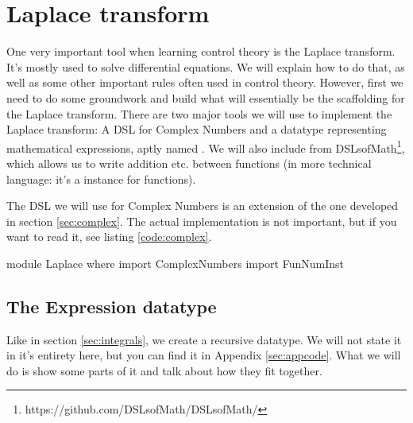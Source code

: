 \section{Laplace transform}
One very important tool when learning control theory is the Laplace transform.
It's mostly used to solve differential equations. We will explain how to do that, as well as some other important rules often used in control theory.
However, first we need to do some groundwork and build what will essentially be the scaffolding for the Laplace transform.
There are two major tools we will use to implement the Laplace transform: A DSL for Complex Numbers and a datatype representing mathematical expressions, aptly named . 
We will also include  from DSLsofMath\footnote{https://github.com/DSLsofMath/DSLsofMath/}, which allows us to write addition etc. between functions (in more technical language: it's a  instance for functions).

The DSL we will use for Complex Numbers is an extension of the one developed in section \ref{sec:complex}. The actual implementation is not important, but if you want to read it, see listing \ref{code:complex}.

\begin{code}
module Laplace where
import ComplexNumbers
import FunNumInst 
\end{code}



\subsection{The Expression datatype}
Like in section \ref{sec:integrals}, we create a recursive datatype. We will not
state it in it's entirety here, but you can find it in Appendix \ref{sec:appcode}. What we
will do is show some parts of it and talk about how they fit together. 

